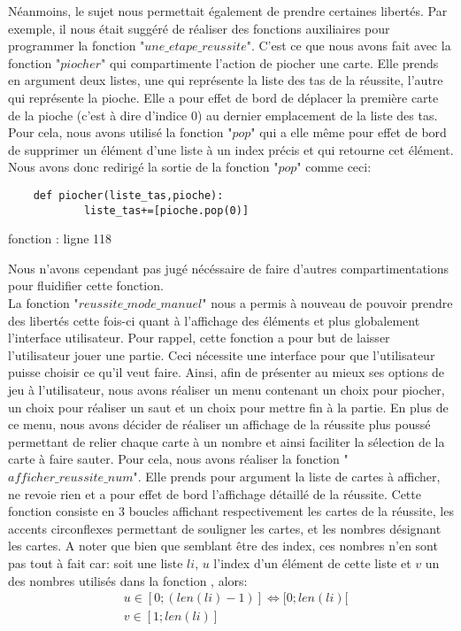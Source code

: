 \documentclass[10pt,a4paper,french,titlepage]{article}
\begin{document}
Néanmoins, le sujet nous permettait également de prendre certaines libertés. Par exemple, il nous était suggéré de réaliser des fonctions
auxiliaires pour programmer la fonction "$une\_etape\_reussite$". C'est ce que nous avons fait avec la fonction "$piocher$" qui compartimente l'action de 
piocher une carte. Elle prends en argument deux listes, une qui représente la liste des tas de la réussite, l'autre qui représente la pioche. Elle a 
pour effet de bord de déplacer la première carte de la pioche (c'est à dire d'indice 0) au dernier emplacement de la liste des tas. Pour cela, nous 
avons utilisé la fonction "$pop$" qui a elle même pour effet de bord de supprimer un élément d'une liste à un index précis et qui retourne cet élément.
Nous avons donc redirigé la sortie de la fonction "$pop$" comme ceci:\\
\begin{lstlisting}
	def piocher(liste_tas,pioche):
    		liste_tas+=[pioche.pop(0)]
\end{lstlisting}
\caption{fonction : ligne 118\\} 

Nous n'avons cependant pas jugé nécéssaire de faire d'autres compartimentations pour fluidifier cette fonction.\\

La fonction "$reussite\_mode\_manuel$" nous a permis à nouveau de pouvoir prendre des libertés cette fois-ci quant à l'affichage des éléments et
plus globalement l'interface utilisateur. Pour rappel, cette fonction a pour but de laisser l'utilisateur jouer une partie. Ceci nécessite une interface
pour que l'utilisateur puisse choisir ce qu'il veut faire. Ainsi, afin de présenter au mieux ses options de jeu à l'utilisateur, nous avons réaliser un
menu contenant un choix pour piocher, un choix pour réaliser un saut et un choix pour mettre fin à la partie. En plus de ce menu, nous avons décider de
réaliser un affichage de la réussite plus poussé permettant de relier chaque carte à un nombre et ainsi faciliter la sélection de la carte à faire
sauter. Pour cela, nous avons réaliser la fonction "$afficher\_reussite\_num$". Elle prends pour argument la liste de cartes à afficher, ne revoie rien et a pour effet de bord l'affichage détaillé de la réussite. Cette fonction consiste en 3 boucles affichant respectivement les cartes de la réussite, les
accents circonflexes permettant de souligner les cartes, et les nombres désignant les cartes. A noter que bien que semblant être des index, ces nombres
n'en sont pas tout à fait car: soit une liste $li$, $u$ l'index d'un élément de cette liste et $v$ un des nombres utilisés dans la fonction , alors:
\begin{align*}
	&u \in [0;(len(li)-1)] \iff [0;len(li)[\\
	&v \in [1;len(li)]
\end{align*}
\end{document}
